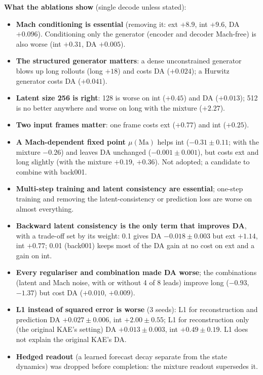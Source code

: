 \documentclass[10.5pt,a4paper]{article}
\begin{document}
\textbf{What the ablations show} (single decode unless stated):
\begin{itemize}
\item \textbf{Mach conditioning is essential} (removing it: ext $+8.9$, int $+9.6$, DA
  $+0.096$). Conditioning only the generator (encoder and decoder Mach-free) is also worse
  (int $+0.31$, DA $+0.005$).
\item \textbf{The structured generator matters}: a dense unconstrained generator blows up long
  rollouts (long $+18$) and costs DA ($+0.024$); a Hurwitz generator costs DA ($+0.041$).
\item \textbf{Latent size 256 is right}: 128 is worse on int ($+0.45$) and DA ($+0.013$); 512
  is no better anywhere and worse on long with the mixture ($+2.27$).
\item \textbf{Two input frames matter}: one frame costs ext ($+0.77$) and int ($+0.25$).
\item \textbf{A Mach-dependent fixed point $\mu(\mathrm{Ma})$} helps int ($-0.31\pm0.11$; with the
  mixture $-0.26$) and leaves DA unchanged ($-0.001\pm0.001$), but costs ext and long slightly
  (with the mixture $+0.19$, $+0.36$). Not adopted; a candidate to combine with back001.
\item \textbf{Multi-step training and latent consistency are essential}; one-step training and
  removing the latent-consistency or prediction loss are worse on almost everything.
\item \textbf{Backward latent consistency is the only term that improves DA}, with a trade-off
  set by its weight: 0.1 gives DA $-0.018\pm0.003$ but ext $+1.14$, int $+0.77$; 0.01 (back001)
  keeps most of the DA gain at no cost on ext and a gain on int.
\item \textbf{Every regulariser and combination made DA worse}; the combinations (latent and Mach
  noise, with or without 4 of 8 leads) improve long ($-0.93$, $-1.37$) but cost DA
  ($+0.010$, $+0.009$).
\item \textbf{L1 instead of squared error is worse} (3 seeds): L1 for reconstruction and
  prediction DA $+0.027\pm0.006$, int $+2.00\pm0.55$; L1 for reconstruction only (the original
  KAE's setting) DA $+0.013\pm0.003$, int $+0.49\pm0.19$. L1 does not explain the original
  KAE's DA.
\item \textbf{Hedged readout} (a learned forecast decay separate from the state dynamics) was
  dropped before completion: the mixture readout supersedes it.
\end{itemize}
\end{document}
